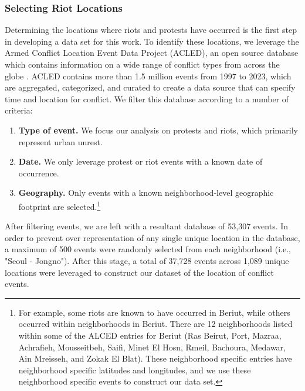 \subsubsection{Selecting Riot Locations}
Determining the locations where riots and protests have occurred is the first step in developing a data set for this work.  To identify these locations, we leverage the Armed Conflict Location Event Data Project (ACLED), an open source database which contains information on a wide range of conflict types from across the globe \citep{ACLED}.  ACLED contains more than 1.5 million events from 1997 to 2023, which are aggregated, categorized, and curated to create a data source that can specify time and location for conflict.  We filter this database according to a number of criteria:
\begin{enumerate}[topsep=0pt,itemsep=-1ex,partopsep=0ex,parsep=0.5ex]
\item \textbf{Type of event. } We focus our analysis on protests and riots, which primarily represent urban unrest.
\item \textbf{Date. } We only leverage protest or riot events with a known date of occurrence.
\item \textbf{Geography. } Only events with a known neighborhood-level geographic footprint are selected.\footnote{For example, some riots are known to have occurred in Beriut, while others occurred within neighborhoods in Beriut. There are 12 neighborhoods listed within some of the ALCED entries for Beriut (Ras Beirut, Port, Mazraa, Achrafieh, Mousseitbeh, Saifi, Minet El Hosn, Rmeil, Bachoura, Medawar, Ain Mreisseh, and Zokak El Blat).  These neighborhood specific entries have neighborhood specific latitudes and longitudes, and we use these neighborhood specific events to construct our data set.}
\end{enumerate}

After filtering events, we are left with a resultant database of 53,307 events. In order to prevent over representation of any single unique location in the database, a maximum of 500 events were randomly selected from each neighborhood (i.e., "Seoul - Jongno"). After this stage, a total of 37,728 events across 1,089 unique locations were leveraged to construct our dataset of the location of conflict events.






